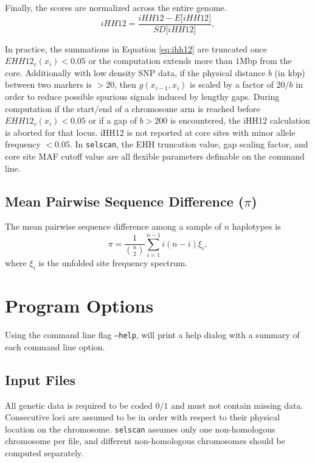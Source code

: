 \documentclass[12pt]{article}%
\begin{document}
Finally, the scores are normalized across the 
entire genome.
\begin{equation}
iHH12 = \frac{iHH12 - E\Big[iHH12\Big]}{SD\Big[iHH12\Big]},
\end{equation}

In practice, the summations in Equation \ref{eq:ihh12} are truncated once 
$EHH12_c(x_i) < 0.05$ or the computation extends more than $1$Mbp from the core.  Additionally with low density SNP data, if the physical 
distance $b$ (in kbp) between two markers is $> 20$, then $g(x_{i-1},x_i)$ is 
scaled by a factor of $20/b$ in order to reduce possible spurious signals 
induced by lengthy gaps.  During computation if the start/end of a chromosome 
arm is reached before $EHH12_c(x_i) < 0.05$ or if a gap of $b > 200$ is 
encountered, the iHH12 calculation is aborted for that locus.  iHH12 is not 
reported at core sites with minor allele frequency $< 0.05$.  In {\tt selscan}, the 
EHH truncation value, gap scaling factor, and core site MAF cutoff value are
all flexible parameters definable on the command line.


\subsection{Mean Pairwise Sequence Difference ($\pi$)}\label{sec:pi}

The mean pairwise sequence difference among a sample of $n$ haplotypes is 
\begin{equation}
\pi = \frac{1}{{n \choose 2}} \sum_{i = 1}^{n-1} i(n-i)\xi_i,
\end{equation}
where $\xi_i$ is the unfolded site frequency spectrum.

\section{Program Options}

Using the command line flag {\tt --help}, will print a help dialog with a summary of each command line option.

\subsection{Input Files}

All genetic data is required to be coded $0/1$ and must not contain missing data.  Consecutive loci are assumed to be in order with respect to their physical location on the chromosome.  {\tt selscan} assumes only one non-homologous chromosome per file, and different non-homologous chromosomes should be computed separately.
\end{document}

